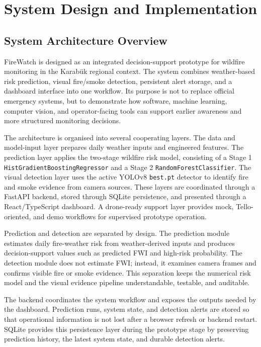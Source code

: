 \chapter{System Design and Implementation}

\section{System Architecture Overview}

FireWatch is designed as an integrated decision-support prototype for wildfire
monitoring in the Karabük regional context. The system combines weather-based
risk prediction, visual fire/smoke detection, persistent alert storage, and a
dashboard interface into one workflow. Its purpose is not to replace official
emergency systems, but to demonstrate how software, machine learning,
computer vision, and operator-facing tools can support earlier awareness and
more structured monitoring decisions.

The architecture is organised into several cooperating layers. The data and
model-input layer prepares daily weather inputs and engineered features. The
prediction layer applies the two-stage wildfire risk model, consisting of a
Stage 1 \texttt{HistGradientBoostingRegressor} and a Stage 2
\texttt{RandomForestClassifier}. The visual detection layer uses the active
YOLOv8 \texttt{best.pt} detector to identify fire and smoke evidence from
camera sources. These layers are coordinated through a FastAPI backend, stored
through SQLite persistence, and presented through a React/TypeScript
dashboard. A drone-ready support layer provides mock, Tello-oriented, and demo
workflows for supervised prototype operation.

Prediction and detection are separated by design. The prediction module
estimates daily fire-weather risk from weather-derived inputs and produces
decision-support values such as predicted FWI and high-risk probability. The
detection module does not estimate FWI; instead, it examines camera frames and
confirms visible fire or smoke evidence. This separation keeps the numerical
risk model and the visual evidence pipeline understandable, testable, and
auditable.

The backend coordinates the system workflow and exposes the outputs needed by
the dashboard. Prediction runs, system state, and detection alerts are stored
so that operational information is not lost after a browser refresh or backend
restart. SQLite provides this persistence layer during the prototype stage by
preserving prediction history, the latest system state, and durable detection
alerts.

